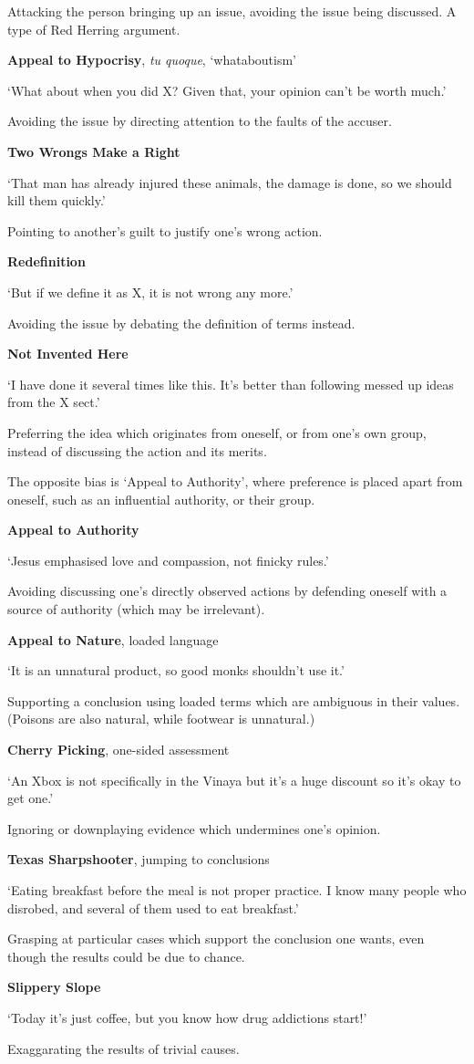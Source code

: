 Attacking the person bringing up an issue, avoiding the issue being
discussed. A type of Red Herring argument.

\textbf{Appeal to Hypocrisy}, \emph{tu quoque}, `whataboutism'

`What about when you did X? Given that, your opinion can't be worth
much.'

Avoiding the issue by directing attention to the faults of the accuser.

\textbf{Two Wrongs Make a Right}

`That man has already injured these animals, the damage is done, so we
should kill them quickly.'

Pointing to another's guilt to justify one's wrong action.

\textbf{Redefinition}

`But if we define it as X, it is not wrong any more.'

Avoiding the issue by debating the definition of terms instead.

\textbf{Not Invented Here}

`I have done it several times like this. It's better than following
messed up ideas from the X sect.'

Preferring the idea which originates from oneself, or from one's own
group, instead of discussing the action and its merits.

The opposite bias is `Appeal to Authority', where preference is placed
apart from oneself, such as an influential authority, or their group.

\clearpage

\textbf{Appeal to Authority}

`Jesus emphasised love and compassion, not finicky rules.'

Avoiding discussing one's directly observed actions by defending oneself
with a source of authority (which may be irrelevant).

\textbf{Appeal to Nature}, loaded language

`It is an unnatural product, so good monks shouldn't use it.'

Supporting a conclusion using loaded terms which are ambiguous in their
values. (Poisons are also natural, while footwear is unnatural.)

\textbf{Cherry Picking}, one-sided assessment

`An Xbox is not specifically in the Vinaya but it's a huge discount so
it's okay to get one.'

Ignoring or downplaying evidence which undermines one's opinion.

\textbf{Texas Sharpshooter}, jumping to conclusions

`Eating breakfast before the meal is not proper practice. I know many
people who disrobed, and several of them used to eat breakfast.'

Grasping at particular cases which support the conclusion one wants,
even though the results could be due to chance.

\textbf{Slippery Slope}

`Today it's just coffee, but you know how drug addictions start!'

Exaggarating the results of trivial causes.


